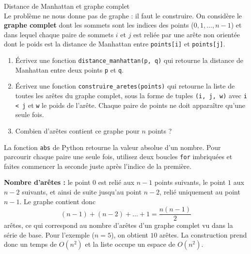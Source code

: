 \begin{Exercice}[15 minutes] [Python] Distance de Manhattan et graphe complet\\

    Le problème ne nous donne pas de graphe : il faut le construire. On considère le \textbf{graphe complet} dont les sommets sont les indices des points ($0, 1, \dots, n-1$) et dans lequel chaque paire de sommets $i$ et $j$ est reliée par une arête non orientée dont le poids est la distance de Manhattan entre \lstinline{points[i]} et \lstinline{points[j]}.

    \begin{enumerate}
        \item Écrivez une fonction \lstinline{distance_manhattan(p, q)} qui retourne la distance de Manhattan entre deux points \lstinline{p} et \lstinline{q}.
        \item Écrivez une fonction \lstinline{construire_aretes(points)} qui retourne la liste de toutes les arêtes du graphe complet, sous la forme de tuples \lstinline{(i, j, w)} avec \lstinline{i < j} et \lstinline{w} le poids de l'arête. Chaque paire de points ne doit apparaître qu'une seule fois.
        \item Combien d'arêtes contient ce graphe pour $n$ points ?
    \end{enumerate}

    

    \begin{conseil}
        La fonction \lstinline{abs} de Python retourne la valeur absolue d'un nombre. Pour parcourir chaque paire une seule fois, utilisez deux boucles \lstinline{for} imbriquées et faites commencer la seconde juste après l'indice de la première.
    \end{conseil}

    \begin{solution}
        

        \textbf{Nombre d'arêtes :} le point $0$ est relié aux $n-1$ points suivants, le point $1$ aux $n-2$ suivants, et ainsi de suite jusqu'au point $n-2$, relié uniquement au point $n-1$. Le graphe contient donc
        \[
            (n-1) + (n-2) + \dots + 1 = \frac{n(n-1)}{2}
        \]
        arêtes, ce qui correspond au nombre d'arêtes d'un graphe complet vu dans la série de base. Pour l'exemple ($n = 5$), on obtient $10$ arêtes. La construction prend donc un temps de $O(n^2)$ et la liste occupe un espace de $O(n^2)$.
    \end{solution}

\end{Exercice}



